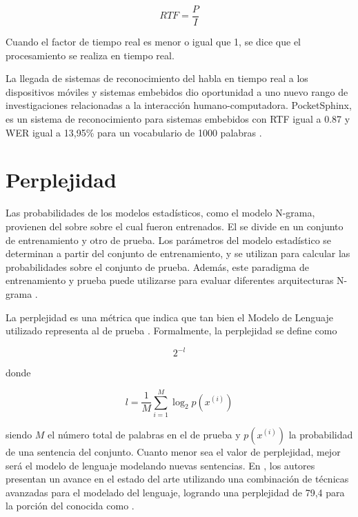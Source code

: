 \begin{equation}
\label{eq:rtf}
    RTF = \frac{P}{I}
\end{equation}

Cuando el factor de tiempo real es menor o igual que 1, se dice que el procesamiento se realiza en tiempo real.

La llegada de sistemas de reconocimiento del habla en tiempo real a los dispositivos m\'oviles y sistemas embebidos dio
oportunidad a uno nuevo rango de investigaciones relacionadas a la interacci\'on humano-computadora. PocketSphinx, es
un sistema de reconocimiento para sistemas embebidos con RTF igual a 0.87 y WER igual a 13,95\% para un vocabulario
de 1000 palabras \cite{HugginsDainesPocketSphinx2006}.

\section{Perplejidad}
\label{sec:perplexity}

Las probabilidades de los modelos estad\'isticos, como el modelo N-grama, provienen del  sobre
sobre el cual fueron entrenados. El  se divide en un conjunto de entrenamiento y otro de prueba.
Los par\'ametros del modelo estad\'istico se determinan a partir del conjunto de entrenamiento, y se utilizan
para calcular las probabilidades sobre el conjunto de prueba. Adem\'as, este paradigma de entrenamiento y prueba
puede utilizarse para evaluar diferentes arquitecturas N-grama \cite{Jurafsky}.

La perplejidad es una m\'etrica que indica que tan bien el Modelo de Lenguaje utilizado representa al  
de prueba \cite{RosenfeldStatistical1997}. Formalmente, la perplejidad se define como

\begin{equation*}
    2^{-l}
\end{equation*}

donde

\begin{equation*}
    l = \frac{1}{M}\sum_{i=1}^{M}\log_2p(x^{(i)})
\end{equation*}

siendo $M$ el n\'umero total de palabras en el  de prueba y $p(x^{(i)})$ la probabilidad de una 
sentencia del conjunto. Cuanto menor sea el valor de perplejidad, mejor ser\'a el modelo de lenguaje modelando
nuevas sentencias. En \cite{MikolovEmpirical2011}, los autores presentan un avance en el estado del arte
utilizando una combinaci\'on de t\'ecnicas avanzadas para el modelado del lenguaje, logrando una perplejidad
de 79,4 para la porci\'on del  conocida como .
